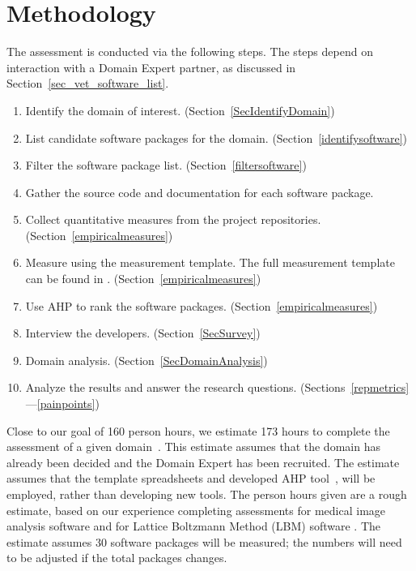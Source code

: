 \documentclass[runningheads]{llncs}
\begin{document}
\section{Methodology} \label{methodology}

The assessment is conducted via the following steps.  The steps depend on
interaction with a Domain Expert partner, as discussed in
Section~\ref{sec_vet_software_list}.

\begin{enumerate}
  \item Identify the domain of interest. (Section~\ref{SecIdentifyDomain})
	\item List candidate software packages for the domain.
	(Section~\ref{identifysoftware})
	\item Filter the software package list. (Section~\ref{filtersoftware})
	\item Gather the source code and documentation for each software package.
	\item Collect quantitative measures from the project repositories.
	(Section~\ref{empiricalmeasures})
	\item Measure using the measurement template.  The full measurement template
	can be found in \cite{SmithEtAl2021}. (Section~\ref{empiricalmeasures})
	\item Use AHP to rank the software packages. (Section~\ref{empiricalmeasures})
	\item Interview the developers. (Section~\ref{SecSurvey})
    \item Domain analysis.  (Section~\ref{SecDomainAnalysis})
	\item Analyze the results and answer the research questions. (Sections~\ref{repmetrics}---\ref{painpoints}) %
\end{enumerate}

Close to our goal of 160 person hours, we estimate 173 hours to complete the
assessment of a given domain~\cite{SmithEtAl2021}.  This estimate assumes that
the domain has already been decided and the Domain Expert has been recruited.
The estimate assumes that the template spreadsheets and developed AHP
tool~\cite{SmithEtAl2021}, will be employed, rather than developing new tools.
The person hours given are a rough estimate, based on our experience completing
assessments for medical image analysis software \cite{Dong2021} and for Lattice
Boltzmann Method (LBM) software \cite{Michalski2021}.  The estimate assumes 30
software packages will be measured; the numbers will need to be adjusted if the
total packages changes.
\end{document}
